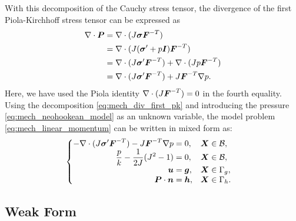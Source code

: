 With this decomposition of the Cauchy stress tensor, the divergence of the
first Piola-Kirchhoff stress tensor can be expressed as
%
\begin{gather}
\begin{aligned}
\nabla \cdot \boldsymbol{P} &= \nabla \cdot ( J \boldsymbol{\sigma} \boldsymbol{F}^{-T} ) \\
&= \nabla \cdot ( J (\boldsymbol{\sigma}' + p \boldsymbol{I}) \boldsymbol{F}^{-T} ) \\
&= \nabla \cdot ( J \boldsymbol{\sigma}' \boldsymbol{F}^{-T} ) +
\nabla \cdot ( J p \boldsymbol{F}^{-T} ) \\
&= \nabla \cdot ( J \boldsymbol{\sigma}' \boldsymbol{F}^{-T} ) + J \boldsymbol{F}^{-T} \nabla p.
\end{aligned}
\label{eq:mech_div_first_pk}
\end{gather}
%
Here, we have used the Piola identity $\nabla \cdot (J \boldsymbol{F}^{-T}) = 0$
in the fourth equality. Using the decomposition \eqref{eq:mech_div_first_pk}
and introducing the pressure \eqref{eq:mech_neohookean_model} as an unknown
variable, the model problem \eqref{eq:mech_linear_momentum} can be written
in mixed form as:
%
\begin{gather}
\begin{cases}
\begin{aligned}
- \nabla \cdot (J \boldsymbol{\sigma}' \boldsymbol{F}^{-T}) - J \boldsymbol{F}^{-T} \nabla p &= 0,
&& \boldsymbol{X} \in \mathcal{B}, \\
\frac{p}{k} - \frac{1}{2 J}(J^2 - 1) &= 0,
&& \boldsymbol{X} \in \mathcal{B}, \\
\boldsymbol{u} &= \boldsymbol{g}, && \boldsymbol{X} \in \Gamma_g, \\
\boldsymbol{P} \cdot \boldsymbol{n} &= \boldsymbol{h}, && \boldsymbol{X} \in \Gamma_h.
\end{aligned}
\end{cases}
\label{eq:mech_strong_form}
\end{gather}

\subsection{Weak Form}

